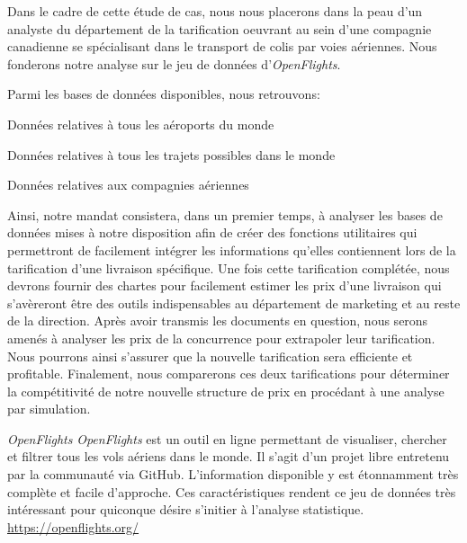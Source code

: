 Dans le cadre de cette étude de cas, nous nous placerons dans la peau d'un analyste du département de la tarification oeuvrant au sein d'une compagnie canadienne se spécialisant dans le transport de colis par voies aériennes. Nous fonderons notre analyse sur le jeu de données d'\emph{OpenFlights}. \cite{OpenFlightsData} 


Parmi les bases de données disponibles, nous retrouvons: \\

\begin{description}[style=multiline,leftmargin=2.5cm]
	\item[airports.dat] Données relatives à tous les aéroports du monde \cite{Data:RouteWorldwide}
	\item[routes.dat] Données relatives à tous les trajets possibles dans le monde \cite{Data:AirportWorldwide}
	\item[airlines.dat] Données relatives aux compagnies aériennes \cite{Data:AirlineWorldWide}
\end{description}

\vspace{\baselineskip}
Ainsi, notre mandat consistera, dans un premier temps, à analyser les bases de données mises à notre disposition afin de créer des fonctions utilitaires qui permettront de facilement intégrer les informations qu'elles contiennent lors de la tarification d'une livraison spécifique. Une fois cette tarification complétée, nous devrons fournir des chartes pour facilement estimer les prix d'une livraison qui s'avèreront être des outils indispensables au département de marketing et au reste de la direction. Après avoir transmis les documents en question, nous serons amenés à analyser les prix de la concurrence pour extrapoler leur tarification. Nous pourrons ainsi s'assurer que la nouvelle tarification sera efficiente et profitable. Finalement, nous comparerons ces deux tarifications pour déterminer la compétitivité de notre nouvelle structure de prix en procédant à une analyse par simulation. \\

\begin{moreInfo}{\emph{OpenFlights}}
	\emph{OpenFlights} est un outil en ligne permettant de visualiser, chercher et filtrer tous les vols aériens dans le monde. Il s’agit d’un projet libre entretenu par la communauté via GitHub. \cite{GitHub} L’information disponible y est étonnamment très complète et facile d’approche. Ces caractéristiques rendent ce jeu de données très intéressant pour quiconque désire s’initier à l’analyse statistique. \\
	\url{https://openflights.org/}
\end{moreInfo}

